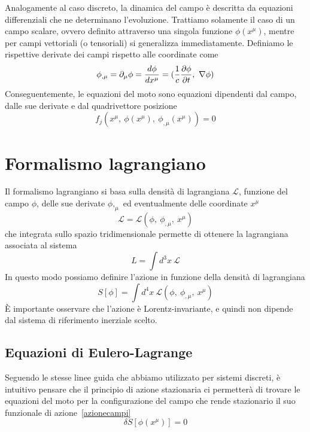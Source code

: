     Analogamente al caso discreto, la dinamica del campo è descritta da equazioni differenziali che ne determinano l'evoluzione. Trattiamo solamente il caso di un campo scalare, ovvero definito attraverso una singola funzione $\phi(x^\mu)$, mentre per campi vettoriali (o tensoriali) si generalizza immediatamente. Definiamo le rispettive derivate dei campi rispetto alle coordinate come
    \begin{equation*}
        \phi_{, \mu} = \partial_\mu \phi = \frac{d\phi}{dx^\mu} = (\frac{1}{c} \frac{\partial\phi}{\partial t}, ~ \nabla \phi)
    \end{equation*}
    Conseguentemente, le equazioni del moto sono equazioni dipendenti dal campo, dalle sue derivate e dal quadrivettore posizione
    \begin{equation} \label{motocampi}
        f_j(x^\mu, ~\phi(x^\mu), ~\phi_{, \mu}(x^\mu)) = 0
    \end{equation}

\section{Formalismo lagrangiano}    

    Il formalismo lagrangiano si basa sulla densità di lagrangiana $\mathcal L$, funzione del campo $\phi$, delle sue derivate $\phi,_\mu$ ed eventualmente delle coordinate $x^\mu$
    \begin{equation} \label{lagrangianacampi}
        \mathcal L = \mathcal L (\phi,~\phi_{, \mu},~x^\mu)
    \end{equation}
    che integrata sullo spazio tridimensionale permette di ottenere la lagrangiana associata al sistema
    \begin{equation*}
        L = \int d^3 x ~ \mathcal L
    \end{equation*}
    In questo modo possiamo definire l'azione in funzione della densità di lagrangiana
    \begin{equation} \label{azionecampi}
        S[\phi] = \int d^4 x ~ \mathcal L (\phi,~\phi_{, \mu},~x^\mu)
    \end{equation}
    È importante osservare che l'azione è Lorentz-invariante, e quindi non dipende dal sistema di riferimento inerziale scelto.

\subsection{Equazioni di Eulero-Lagrange}

    Seguendo le stesse linee guida che abbiamo utilizzato per sistemi discreti, è intuitivo pensare che il principio di azione stazionaria ci permetterà di trovare le equazioni del moto per la configurazione del campo che rende stazionario il suo funzionale di azione~\eqref{azionecampi}
    \begin{equation} \label{azionestazionariacampi}
        \delta S [\phi(x^\mu)] = 0
    \end{equation}

